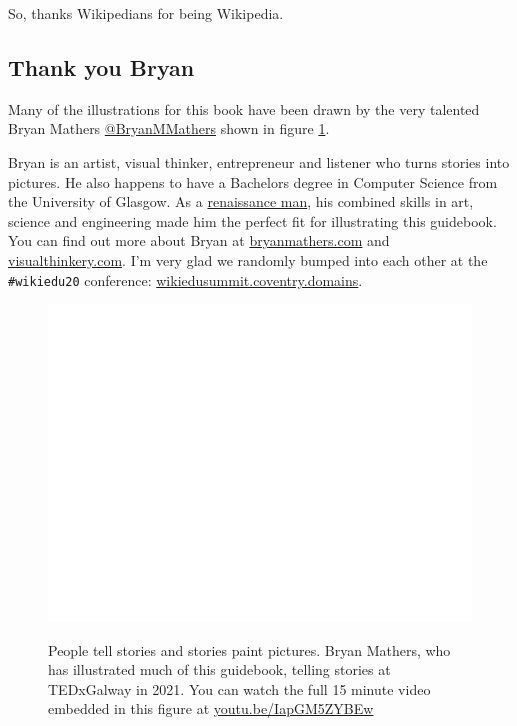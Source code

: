 \documentclass[
]{book}
\begin{document}
So, thanks Wikipedians for being Wikipedia. 🙏

\hypertarget{visualthinkery}{%
\subsection{Thank you Bryan}\label{visualthinkery}}

Many of the illustrations for this book have been drawn by the very talented Bryan Mathers \href{https://twitter.com/BryanMMathers/}{@BryanMMathers} shown in figure \ref{fig:tedx-galway-fig}.

Bryan is an artist, visual thinker, entrepreneur and listener who turns stories into pictures. He also happens to have a Bachelors degree in Computer Science from the University of Glasgow. As a \href{https://en.wikipedia.org/wiki/Renaissance_man}{renaissance man}, his combined skills in art, science and engineering made him the perfect fit for illustrating this guidebook. You can find out more about Bryan at \href{https://bryanmmathers.com}{bryanmathers.com} and \href{https://visualthinkery.com}{visualthinkery.com}. I'm very glad we randomly bumped into each other at the \texttt{\#wikiedu20} conference: \href{https://wikiedusummit.coventry.domains/}{wikiedusummit.coventry.domains}.

\begin{figure}

{\centering \href{https://www.youtube.com/embed/IapGM5ZYBEw}{\includegraphics[width=1\linewidth]{cdyf_files/figure-latex/tedx-galway-fig-1} }

}

\caption{People tell stories and stories paint pictures. Bryan Mathers, who has illustrated much of this guidebook, telling stories at TEDxGalway in 2021. You can watch the full 15 minute video embedded in this figure at \href{https://youtu.be/IapGM5ZYBEw}{youtu.be/IapGM5ZYBEw} \citep{tedxgalway}}\label{fig:tedx-galway-fig}
\end{figure}
\end{document}
